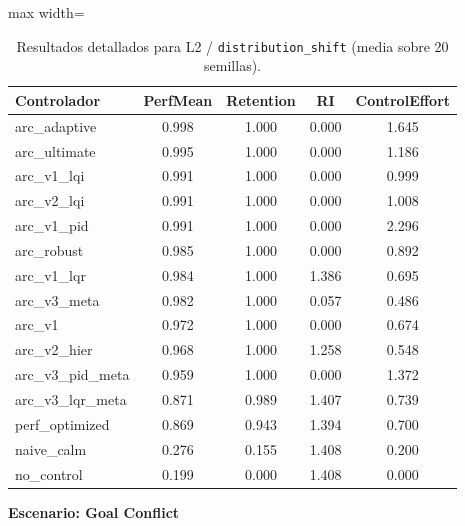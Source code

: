 \documentclass{article}
\newcommand{\scenarioheader}[1]{\Needspace{20\baselineskip}\textbf{Escenario: #1}}
\begin{document}
\begin{table}[H]
\centering
\footnotesize
\caption{Resultados detallados para L2 / \texttt{distribution\_shift} (media sobre 20 semillas).}
\label{tab:g4_distribution_shift}
\begin{adjustbox}{max width=\textwidth}
\begin{tabular}{@{}lcccc@{}}
\toprule
Controlador & PerfMean & Retention & RI & ControlEffort \\ \midrule
arc\_adaptive & 0.998 & 1.000 & 0.000 & 1.645 \\
arc\_ultimate & 0.995 & 1.000 & 0.000 & 1.186 \\
arc\_v1\_lqi & 0.991 & 1.000 & 0.000 & 0.999 \\
arc\_v2\_lqi & 0.991 & 1.000 & 0.000 & 1.008 \\
arc\_v1\_pid & 0.991 & 1.000 & 0.000 & 2.296 \\
arc\_robust & 0.985 & 1.000 & 0.000 & 0.892 \\
arc\_v1\_lqr & 0.984 & 1.000 & 1.386 & 0.695 \\
arc\_v3\_meta & 0.982 & 1.000 & 0.057 & 0.486 \\
arc\_v1 & 0.972 & 1.000 & 0.000 & 0.674 \\
arc\_v2\_hier & 0.968 & 1.000 & 1.258 & 0.548 \\
arc\_v3\_pid\_meta & 0.959 & 1.000 & 0.000 & 1.372 \\
arc\_v3\_lqr\_meta & 0.871 & 0.989 & 1.407 & 0.739 \\
perf\_optimized & 0.869 & 0.943 & 1.394 & 0.700 \\
naive\_calm & 0.276 & 0.155 & 1.408 & 0.200 \\
no\_control & 0.199 & 0.000 & 1.408 & 0.000 \\ \bottomrule
\end{tabular}
\end{adjustbox}
\end{table}

\scenarioheader{Goal Conflict}
\end{document}
